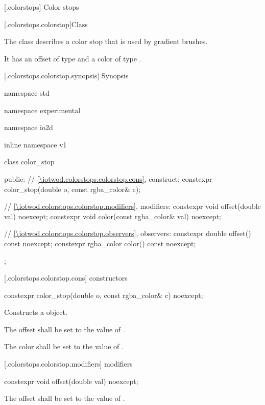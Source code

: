  [\iotwod.colorstops] {Color stops}

 [\iotwod.colorstops.colorstop]{Class }

\pnum
{}
The class  describes a color stop that is used by gradient brushes.

\pnum
It has an offset of type  and a color of type .

 [\iotwod.colorstops.colorstop.synopsis] { Synopsis}

\begin{codeblock}
namespace std { namespace experimental { namespace io2d { inline namespace v1 {
  class color_stop {
  public:
  	// \ref{\iotwod.colorstops.colorstop.cons}, construct:
    constexpr color_stop(double o, const rgba_color& c);
    
    // \ref{\iotwod.colorstops.colorstop.modifiers}, modifiers:
    constexpr void offset(double val) noexcept;
	constexpr void color(const rgba_color& val) noexcept;
	
    // \ref{\iotwod.colorstops.colorstop.observers}, observers:
	constexpr double offset() const noexcept;
	constexpr rgba_color color() const noexcept;
  };
} } } }
\end{codeblock}

 [\iotwod.colorstops.colorstop.cons]{ constructors}

\begin{itemdecl}
	constexpr color_stop(double o, const rgba_color& c) noexcept;
\end{itemdecl}
\begin{itemdescr}
	\pnum
	\effects
	Constructs a  object.
	
	\pnum
	The offset shall be set to the value of .
	
	\pnum
	The color shall be set to the value of .
\end{itemdescr}

 [\iotwod.colorstops.colorstop.modifiers]{ modifiers}

\begin{itemdecl}
	constexpr void offset(double val) noexcept;
\end{itemdecl}
\begin{itemdescr}
	\pnum
	\effects
	The offset shall be set to the value of .
\end{itemdescr}

